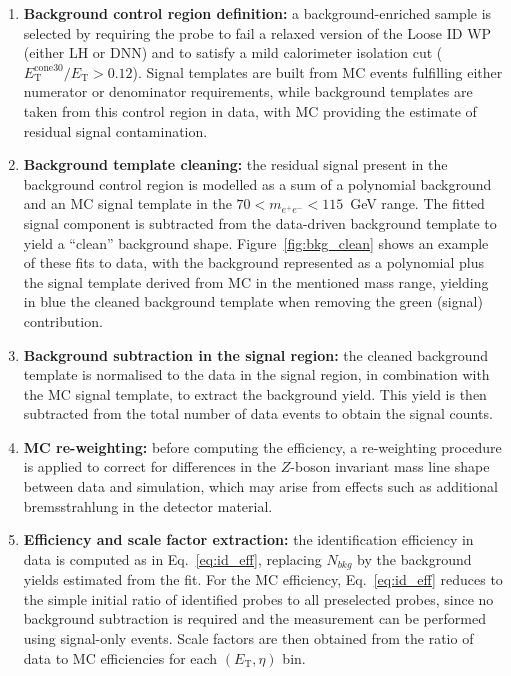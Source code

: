 \begin{enumerate}
    \item \textbf{Background control region definition:} a background-enriched sample is selected by requiring the probe to fail a relaxed version of the Loose ID WP (either LH or DNN) and to satisfy a mild calorimeter isolation cut ($E_{\mathrm{T}}^{\mathrm{cone30}}/E_{\mathrm{T}}>0.12$). Signal templates are built from MC events fulfilling either numerator or denominator requirements, while background templates are taken from this control region in data, with MC providing the estimate of residual signal contamination.

    \item \textbf{Background template cleaning:} the residual signal present in the background control region is modelled as a sum of a polynomial background and an MC signal template in the $70 < m_{e^+e^-} < 115$~GeV range. The fitted signal component is subtracted from the data-driven background template to yield a “clean” background shape. Figure~\ref{fig:bkg_clean} shows an example of these fits to data, with the background represented as a polynomial plus the signal template derived from MC in the mentioned mass range, yielding in blue the cleaned background template when removing the green (signal) contribution.

    \item \textbf{Background subtraction in the signal region:} the cleaned background template is normalised to the data in the signal region, in combination with the MC signal template, to extract the background yield. This yield is then subtracted from the total number of data events to obtain the signal counts.

    \item \textbf{MC re-weighting:} before computing the efficiency, a re-weighting procedure is applied to correct for differences in the $Z$-boson invariant mass line shape between data and simulation, which may arise from effects such as additional bremsstrahlung in the detector material.

    \item \textbf{Efficiency and scale factor extraction:} the identification efficiency in data is computed as in Eq.~\ref{eq:id_eff}, replacing $N_{bkg}$ by the background yields estimated from the fit. For the MC efficiency, Eq.~\ref{eq:id_eff} reduces to the simple initial ratio of identified probes to all preselected probes, since no background subtraction is required and the measurement can be performed using signal-only events. Scale factors are then obtained from the ratio of data to MC efficiencies for each $(E_{\mathrm{T}},\eta)$ bin.
\end{enumerate}

